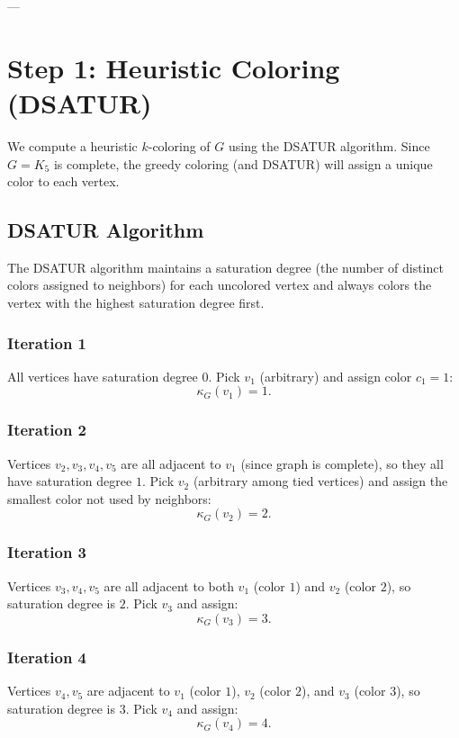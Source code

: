 \documentclass[11pt]{article}
\theoremstyle{definition}
\begin{document}
---

\section{Step 1: Heuristic Coloring (DSATUR)}

We compute a heuristic $k$-coloring of $G$ using the DSATUR algorithm. Since $G = K_5$ is complete, the greedy coloring (and DSATUR) will assign a unique color to each vertex.

\subsection{DSATUR Algorithm}

The DSATUR algorithm maintains a saturation degree (the number of distinct colors assigned to neighbors) for each uncolored vertex and always colors the vertex with the highest saturation degree first.

\subsubsection{Iteration 1}

All vertices have saturation degree $0$. Pick $v_1$ (arbitrary) and assign color $c_1 = 1$:
\[
\kappa_G(v_1) = 1.
\]

\subsubsection{Iteration 2}

Vertices $v_2, v_3, v_4, v_5$ are all adjacent to $v_1$ (since graph is complete), so they all have saturation degree $1$. Pick $v_2$ (arbitrary among tied vertices) and assign the smallest color not used by neighbors:
\[
\kappa_G(v_2) = 2.
\]

\subsubsection{Iteration 3}

Vertices $v_3, v_4, v_5$ are all adjacent to both $v_1$ (color $1$) and $v_2$ (color $2$), so saturation degree is $2$. Pick $v_3$ and assign:
\[
\kappa_G(v_3) = 3.
\]

\subsubsection{Iteration 4}

Vertices $v_4, v_5$ are adjacent to $v_1$ (color $1$), $v_2$ (color $2$), and $v_3$ (color $3$), so saturation degree is $3$. Pick $v_4$ and assign:
\[
\kappa_G(v_4) = 4.
\]
\end{document}
